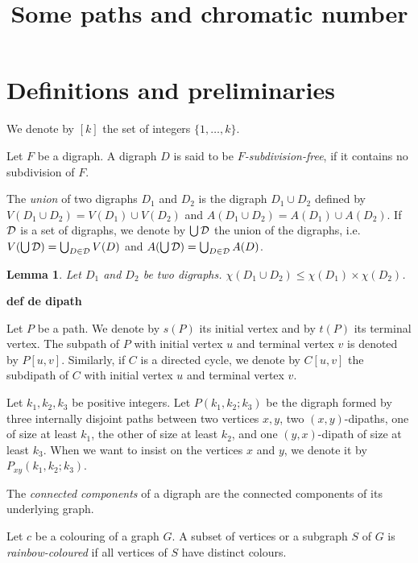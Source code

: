 \documentclass[utf8,10pt]{article}
\title{Some paths and chromatic number}
\theoremstyle{plain}
\newtheorem{lemma}[theorem]{Lemma}
\theoremstyle{definition}
\theoremstyle{remark}
\begin{document}
\maketitle

\section{Definitions and preliminaries}


We denote by $[k]$ the set of integers $\{1, \dots , k\}$.

Let $F$ be a digraph.
A digraph $D$ is said to be {\it $F$-subdivision-free}, if it contains no subdivision of $F$.

The {\it union} of two digraphs $D_1$ and $D_2$ is the digraph  $D_1\cup D_2$ defined by $V(D_1\cup D_2) = V(D_1)\cup V(D_2)$ and 
$A(D_1\cup D_2) = A(D_1)\cup A(D_2)$.
If ${\cal D}$ is a set of digraphs, we denote by $\bigcup {\cal D}$ the union of the digraphs, i.e. $V(\bigcup {\cal D}) =\bigcup_{D\in {\cal D}} V(D)$
and $A(\bigcup {\cal D}) =\bigcup_{D\in {\cal D}} A(D)$.

\begin{lemma}\label{lem:decomp}
Let $D_1$ and $D_2$ be two digraphs.
$\chi(D_1\cup D_2) \leq \chi(D_1)\times \chi(D_2)$.
\end{lemma}



{\bf def de dipath}

Let $P$ be a path. We denote by $s(P)$ its initial vertex and by $t(P)$ its terminal vertex.
The subpath of $P$ with initial vertex $u$ and terminal vertex $v$ is denoted by $P[u,v]$.
Similarly, if $C$ is a directed cycle, we denote by $C[u,v]$ the subdipath of $C$ with initial vertex $u$ and terminal vertex $v$.


Let $k_1,k_2,k_3$ be positive integers. Let $P(k_1,k_2;k_3)$ be the digraph formed by three internally disjoint paths between two vertices $x,y$, two $(x,y)$-dipaths, one of size at least $k_1$, the other of size at least $k_2$, and one $(y,x)$-dipath of size at least $k_3$.
When we want to insist on the vertices $x$ and $y$, we denote it by $P_{xy}(k_1,k_2;k_3)$.


The {\it connected components} of a digraph are the connected components of its underlying graph.

Let $c$ be a colouring of a graph $G$. A subset of vertices or a subgraph $S$ of $G$ is {\it rainbow-coloured} if all vertices of $S$ have distinct colours.
\end{document}
